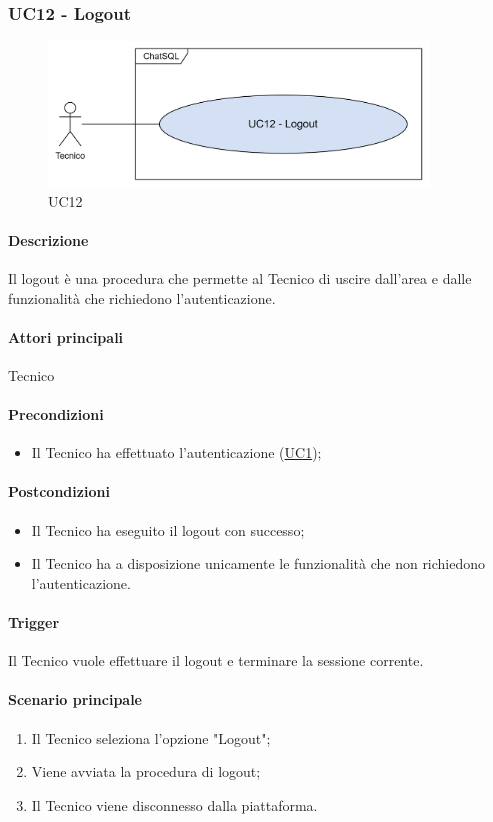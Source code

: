 \subsubsection{UC12 - Logout}\label{UC12}

\begin{figure}[H]
  \centering
  \includegraphics[width=0.90\textwidth]{assets/uc12.png}
  \caption{UC12}
\end{figure}

\paragraph*{Descrizione}
Il logout è una procedura che permette al Tecnico di uscire dall'area e dalle funzionalità che richiedono l'autenticazione.

\paragraph*{Attori principali}
Tecnico

\paragraph*{Precondizioni}
\begin{itemize}
  \item Il Tecnico ha effettuato l'autenticazione (\hyperref[UC1]{UC1});
\end{itemize}

\paragraph*{Postcondizioni}
\begin{itemize}
  \item Il Tecnico ha eseguito il logout con successo;
  \item Il Tecnico ha a disposizione unicamente le funzionalità che non richiedono l'autenticazione.
\end{itemize}

\paragraph*{Trigger}
Il Tecnico vuole effettuare il logout e terminare la sessione corrente.

\paragraph*{Scenario principale}
\begin{enumerate}
  \item Il Tecnico seleziona l'opzione "Logout";
  \item Viene avviata la procedura di logout;
  \item Il Tecnico viene disconnesso dalla piattaforma.
\end{enumerate}
